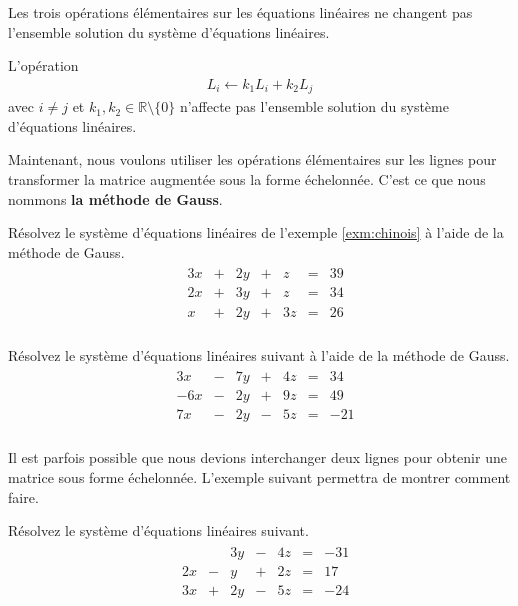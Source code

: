 \documentclass[]{book}
\theoremstyle{definition}
\theoremstyle{definition}
\theoremstyle{definition}
\theoremstyle{remark}
\let\BeginKnitrBlock\begin \let\EndKnitrBlock\end
\begin{document}
\BeginKnitrBlock{theorem}
\protect\hypertarget{thm:unnamed-chunk-21}{}{\label{thm:unnamed-chunk-21} }Les trois opérations élémentaires sur les équations linéaires ne changent pas l'ensemble solution du système d'équations linéaires.
\EndKnitrBlock{theorem}

\BeginKnitrBlock{proposition}
\protect\hypertarget{prp:unnamed-chunk-22}{}{\label{prp:unnamed-chunk-22} }L'opération
\begin{align*}
L_i\leftarrow k_1L_i+k_2L_j
\end{align*}
avec \(i\neq j\) et \(k_1,k_2\in\mathbb{R}\setminus \{0\}\) n'affecte pas l'ensemble solution du système d'équations linéaires.
\EndKnitrBlock{proposition}

Maintenant, nous voulons utiliser les opérations élémentaires sur les lignes pour transformer la matrice augmentée sous la forme échelonnée. C'est ce que nous nommons \textbf{la méthode de Gauss}.

\BeginKnitrBlock{example}
\protect\hypertarget{exm:unnamed-chunk-23}{}{\label{exm:unnamed-chunk-23} }Résolvez le système d'équations linéaires de l'exemple \ref{exm:chinois} à l'aide de la méthode de Gauss.
\begin{align*}
\begin{array}{cccccccc}
&3x&+&2y&+&z&=&39\\
&2x&+&3y&+&z&=&34\\
&x&+&2y&+&3z&=&26\\
\end{array}
\end{align*}
\EndKnitrBlock{example}

\BeginKnitrBlock{example}
\protect\hypertarget{exm:unnamed-chunk-24}{}{\label{exm:unnamed-chunk-24} }Résolvez le système d'équations linéaires suivant à l'aide de la méthode de Gauss.
\begin{align*}
\begin{array}{cccccccc}
&3x&-&7y&+&4z&=&34\\
&-6x&-&2y&+&9z&=&49\\
&7x&-&2y&-&5z&=&-21\\
\end{array}
\end{align*}
\EndKnitrBlock{example}

Il est parfois possible que nous devions interchanger deux lignes pour obtenir une matrice sous forme échelonnée. L'exemple suivant permettra de montrer comment faire.

\BeginKnitrBlock{example}
\protect\hypertarget{exm:unnamed-chunk-25}{}{\label{exm:unnamed-chunk-25} }Résolvez le système d'équations linéaires suivant.
\begin{align*}
\begin{array}{cccccccc}
&&&3y&-&4z&=&-31\\
&2x&-&y&+&2z&=&17\\
&3x&+&2y&-&5z&=&-24\\
\end{array}
\end{align*}
\EndKnitrBlock{example}
\end{document}
